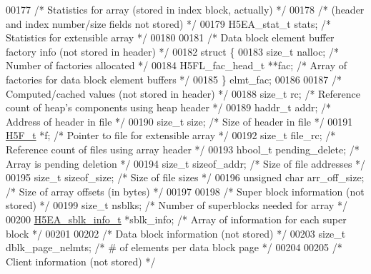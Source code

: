 \begin{DoxyCode}
00177     \textcolor{comment}{/* Statistics for array (stored in index block, actually) */}
00178     \textcolor{comment}{/* (header and index number/size fields not stored) */}
00179     H5EA\_stat\_t stats;                  \textcolor{comment}{/* Statistics for extensible array */}
00180 
00181     \textcolor{comment}{/* Data block element buffer factory info (not stored in header) */}
00182     \textcolor{keyword}{struct }\{
00183         \textcolor{keywordtype}{size\_t} nalloc;                  \textcolor{comment}{/* Number of factories allocated */}
00184         H5FL\_fac\_head\_t **fac;          \textcolor{comment}{/* Array of factories for data block element buffers */}
00185     \} elmt\_fac;
00186 
00187     \textcolor{comment}{/* Computed/cached values (not stored in header) */}
00188     \textcolor{keywordtype}{size\_t} rc;                          \textcolor{comment}{/* Reference count of heap's components using heap header */}
00189     haddr\_t addr;                       \textcolor{comment}{/* Address of header in file */}
00190     \textcolor{keywordtype}{size\_t} size;                        \textcolor{comment}{/* Size of header in file */}
00191     \hyperlink{struct_h5_f__t}{H5F\_t} *f;                           \textcolor{comment}{/* Pointer to file for extensible array */}
00192     \textcolor{keywordtype}{size\_t} file\_rc;                     \textcolor{comment}{/* Reference count of files using array header */}
00193     hbool\_t pending\_delete;             \textcolor{comment}{/* Array is pending deletion */}
00194     \textcolor{keywordtype}{size\_t} sizeof\_addr;                 \textcolor{comment}{/* Size of file addresses */}
00195     \textcolor{keywordtype}{size\_t} sizeof\_size;                 \textcolor{comment}{/* Size of file sizes */}
00196     \textcolor{keywordtype}{unsigned} \textcolor{keywordtype}{char} arr\_off\_size;         \textcolor{comment}{/* Size of array offsets (in bytes) */}
00197 
00198     \textcolor{comment}{/* Super block information (not stored) */}
00199     \textcolor{keywordtype}{size\_t} nsblks;                      \textcolor{comment}{/* Number of superblocks needed for array */}
00200     \hyperlink{struct_h5_e_a__sblk__info__t}{H5EA\_sblk\_info\_t} *sblk\_info;        \textcolor{comment}{/* Array of information for each super block */}
00201 
00202     \textcolor{comment}{/* Data block information (not stored) */}
00203     \textcolor{keywordtype}{size\_t} dblk\_page\_nelmts;            \textcolor{comment}{/* # of elements per data block page */}
00204 
00205     \textcolor{comment}{/* Client information (not stored) */}

\end{DoxyCode}
